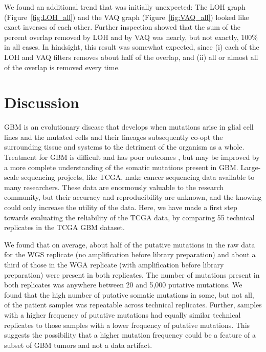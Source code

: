 \documentclass[11pt]{article} %
\begin{document}
{We found an additional trend that was initially unexpected: The LOH graph (Figure~\ref{fig:LOH_all}) and the VAQ graph (Figure~\ref{fig:VAQ_all}) looked like exact inverses of each other. Further inspection showed that the sum of the percent overlap removed by LOH and by VAQ was nearly, but not exactly, 100\% in all cases. In hindsight, this result was somewhat expected, since (i) each of the LOH and VAQ filters removes about half of the overlap, and (ii) all or almost all of the overlap is removed every time.

\section*{Discussion}

GBM is an evolutionary disease that develops when mutations arise in glial cell lines and the mutated cells and their lineages subsequently co-opt the surrounding tissue and systems to the detriment of the organism as a whole. Treatment for GBM is difficult and has poor outcomes \citep{GBM-stats}, but may be improved by a more complete understanding of the somatic mutations present in GBM. Large-scale sequencing projects, like TCGA, make cancer sequencing data available to many researchers. These data are enormously valuable to the research community, but their accuracy and reproducibility are unknown, and the knowing could only increase the utility of the data. Here, we have made a first step towards evaluating the reliability of the TCGA data, by comparing 55 technical replicates in the TCGA GBM dataset.  

We found that on average, about half of the putative mutations in the raw data for the WGS replicate (no amplification before library preparation) and about a third of those in the WGA replicate (with amplification before library preparation) were present in both replicates. The number of mutations present in both replicates was anywhere between 20 and 5,000 putative mutations. We found that the high number of putative somatic mutations in some, but not all, of the patient samples was repeatable across technical replicates. Further, samples with a higher frequency of putative mutations had equally similar technical replicates to those samples with a lower frequency of putative mutations. This suggests the possibility that a higher mutation frequency could be a feature of a subset of GBM tumors and not a data artifact.

}
\end{document}
